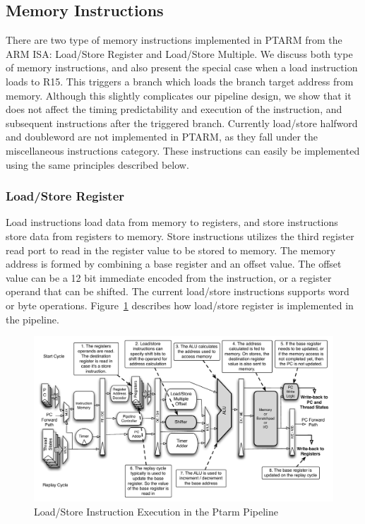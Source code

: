 \subsection{Memory Instructions}
There are two type of memory instructions implemented in PTARM from the ARM ISA: Load/Store Register and Load/Store Multiple.
We discuss both type of memory instructions, and also present the special case when a load instruction loads to R15.
This triggers a branch which loads the branch target address from memory.  
Although this slightly complicates our pipeline design, we show that it does not affect the timing predictability and execution of the instruction, and subsequent instructions after the triggered branch.
Currently load/store halfword and doubleword are not implemented in PTARM, as they fall under the miscellaneous instructions category. 
These instructions can easily be implemented using the same principles described below.       
  
\subsubsection{Load/Store Register}
\label{sec:ptarm_instruction_ldstr}
Load instructions load data from memory to registers, and store instructions store data from registers to memory.
Store instructions utilizes the third register read port to read in the register value to be stored to memory.
The memory address is formed by combining a base register and an offset value.
The offset value can be a 12 bit immediate encoded from the instruction, or a register operand that can be shifted.
The current load/store instructions supports word or byte operations.
Figure~\ref{fig:ldstr_pipeline_implementation} describes how load/store register is implemented in the pipeline.

\begin{figure}[h]
  \begin{center}
    \includegraphics[scale=.54]{figs/ldstr_pipeline_implementation}
  \end{center}
  \vspace{-3mm}
  \caption{Load/Store Instruction Execution in the Ptarm Pipeline}
  \label{fig:ldstr_pipeline_implementation}
\end{figure}

